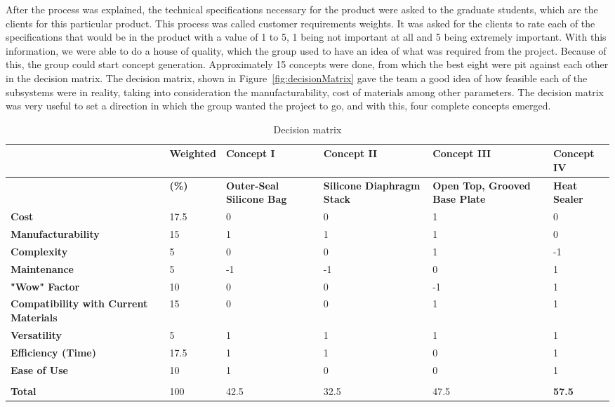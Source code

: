 \documentclass[12pt,letterpaper,notitlepage]{article}
\begin{document}
After the process was explained, the technical specifications necessary for the product were asked to the graduate students, which are the clients for this particular product. This process was called customer requirements weights. It was asked for the clients to rate each of the specifications that would be in the product with a value of 1 to 5,  1 being not important at all and 5 being extremely important. With this information, we were able to do a house of quality, which the group used to have an idea of what was required from the project. Because of this, the group could start concept generation. Approximately 15 concepts were done, from which the best eight were pit against each other in the decision matrix. The decision matrix, shown in Figure~\ref{fig:decisionMatrix} gave the team a good idea of how feasible each of the subsystems were in reality, taking into consideration the manufacturability, cost of materials among other parameters. The decision matrix was very useful to set a direction in which the group wanted the project to go, and with this, four complete concepts emerged.\\
\begin{table}[htbp]
  \centering
    \begin{tabular}{C{3cm}C{1.5cm}C{3cm}C{3cm}C{3cm}C{3cm}}
    \toprule
          & \textbf{Weighted } & Concept I  & Concept II & Concept III & Concept IV \\
    \midrule
    \textbf{} & \textbf{(\%)} & \textbf{Outer-Seal Silicone Bag} & \textbf{Silicone Diaphragm Stack} & \textbf{Open Top, Grooved Base Plate} & \textbf{Heat Sealer} \\
\hline
    \textbf{Cost} & 17.5  & 0     & 0     & 1     & 0 \\
    \textbf{Manufacturability} & 15    & 1     & 1     & 1     & 0 \\
    \textbf{Complexity} & 5     & 0     & 0     & 1     & -1 \\
    \textbf{Maintenance} & 5     & -1    & -1    & 0     & 1 \\
    \textbf{"Wow" Factor} & 10    & 0     & 0     & -1    & 1 \\
    \textbf{Compatibility with Current Materials} & 15    & 0     & 0     & 1     & 1 \\
    \textbf{Versatility} & 5     & 1     & 1     & 1     & 1 \\
    \textbf{Efficiency (Time)} & 17.5  & 1     & 1     & 0     & 1 \\
    \textbf{Ease of Use} & 10    & 1     & 0     & 0     & 1 \\
    \textbf{} &       &       &       &       &  \\
\hline
    \textbf{Total} & 100   & 42.5  & 32.5  & 47.5  & \textbf{57.5} \\
    \bottomrule
    \end{tabular}%
  \label{tab:decisionMatrix}%
  \caption{Decision matrix}
\end{table}%
\end{document}
